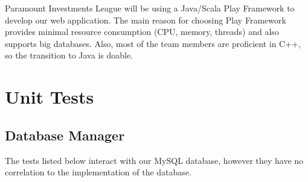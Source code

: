 Paramount Investments League will be using a Java/Scala Play Framework to
develop our web application. The main reason for choosing Play Framework
provides minimal resource consumption (CPU, memory, threads) and also supports
big databases. Also, most of the team members are proficient in C++, so the
transition to Java is doable.\\

\section{Unit Tests}

\subsection{Database Manager}
 The tests listed below interact with our MySQL database, however they have no
 correlation to the implementation of the database.

